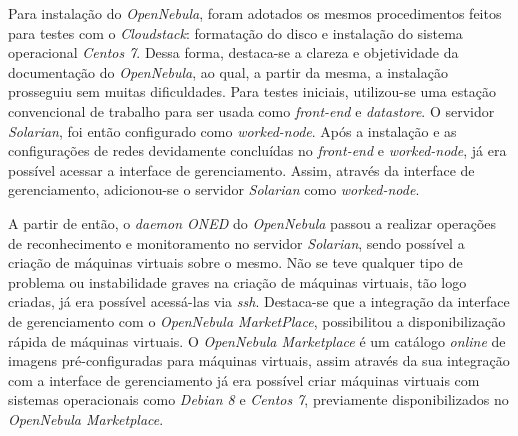 \begin{apendicesenv}
Para instalação do \textit{OpenNebula}, foram adotados os mesmos procedimentos feitos para testes com o \textit{Cloudstack}: formatação do disco e instalação do sistema operacional \textit{Centos 7}. Dessa forma, destaca-se a clareza e objetividade da documentação do \textit{OpenNebula}, ao qual, a partir da mesma, a instalação prosseguiu sem muitas dificuldades. Para testes iniciais, utilizou-se uma estação convencional de trabalho para ser usada como \textit{front-end} e \textit{datastore}. O servidor \textit{Solarian}, foi então configurado como \textit{worked-node}. Após a instalação e as configurações de redes devidamente concluídas no \textit{front-end} e \textit{worked-node}, já era possível acessar a interface de gerenciamento. Assim, através da interface de gerenciamento, adicionou-se o servidor \textit{Solarian} como \textit{worked-node}.

 A partir de então, o \textit{daemon ONED} do \textit{OpenNebula} passou a realizar operações de reconhecimento e monitoramento no servidor \textit{Solarian}, sendo possível a criação de máquinas virtuais sobre o mesmo. Não se teve qualquer tipo de problema ou instabilidade graves na criação de máquinas virtuais, tão logo criadas, já era possível acessá-las via \textit{ssh}. Destaca-se que a integração da interface de gerenciamento com o \textit{OpenNebula MarketPlace}, possibilitou a disponibilização rápida de máquinas virtuais. O \textit{OpenNebula Marketplace} é um catálogo \textit{online} de imagens pré-configuradas para máquinas virtuais, assim através da sua integração com a interface de gerenciamento já era possível criar máquinas virtuais com sistemas operacionais como \textit{Debian 8} e \textit{Centos 7}, previamente disponibilizados no \textit{OpenNebula Marketplace}. 


\end{apendicesenv}
